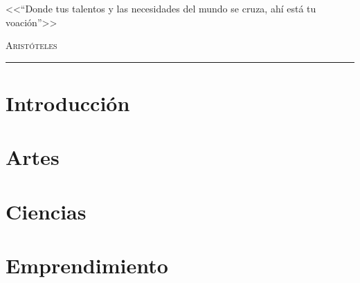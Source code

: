 \documentclass[12pt,a4paper]{book}
\begin{document}
\renewcommand{\contentsname}{\vspace{0cm} Contenido \vspace{-2cm}}

\begin{titlepage}
\vspace*{2cm}

\noindent
\vspace*{0.5cm}

\vspace{1.5cm}
\epigraph{<<``Donde tus talentos y las necesidades del mundo se cruza, ahí está tu voación''>>}%
{ \textsc{Aristóteles}}
\null\vfill
\vspace*{1cm}
\noindent
\hfill
\begin{minipage}{0.7\linewidth}
    \begin{flushright}
        \printauthor %
    \end{flushright}
\end{minipage}
%
\begin{minipage}{0.02\linewidth}
    \rule{1pt}{70pt}
\end{minipage}
\titlepagedecoration
\end{titlepage}

\let\cleardoublepage=\clearpage
\tableofcontents
\newpage
\chapter{Introducción}

\newpage\thispagestyle{empty}%

\chapter{Artes } 

\newpage\thispagestyle{empty}%

\chapter{Ciencias}

\newpage\thispagestyle{empty}%

\chapter{Emprendimiento}




%
%
\nocite{*}
\end{document}
